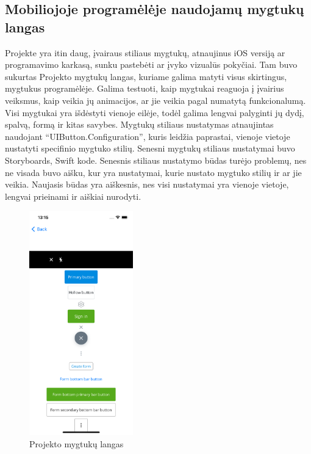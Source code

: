 \subsection{Mobiliojoje programėlėje naudojamų mygtukų langas}
Projekte yra itin daug, įvairaus stiliaus mygtukų, atnaujinus iOS versiją ar programavimo karkasą, sunku pastebėti ar įvyko vizualūs pokyčiai. Tam buvo sukurtas Projekto mygtukų langas, kuriame galima matyti visus skirtingus, mygtukus programėlėje. 
Galima testuoti, kaip mygtukai reaguoja į įvairius veiksmus, kaip veikia jų animacijos, ar jie veikia pagal numatytą funkcionalumą. Visi mygtukai yra išdėstyti vienoje eilėje, todėl galima lengvai palyginti jų dydį, spalvą, formą ir kitas savybes. Mygtukų stiliaus nustatymas atnaujintas naudojant \enquote{UIButton.Configuration}, kuris leidžia paprastai, vienoje vietoje nustatyti specifinio mygtuko stilių. Senesni mygtukų stiliaus nustatymai buvo Storyboards, Swift kode.
Senesnis stiliaus nustatymo būdas turėjo problemų, nes ne visada buvo aišku, kur yra nustatymai, kurie nustato mygtuko stilių ir ar jie veikia. Naujasis būdas yra aiškesnis, nes visi nustatymai yra vienoje vietoje, lengvai prieinami ir aiškiai nurodyti.
\begin{figure}[htbp!]
    \centering
    \includegraphics[width=0.4\textwidth]{Images/buttonsView.png}
    \caption{Projekto mygtukų langas}
    \label{fig:buttonsView.png}
\end{figure}
\newpage
